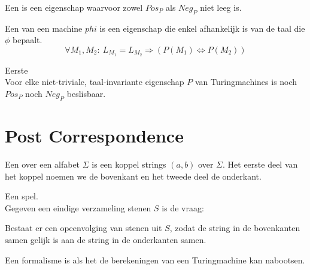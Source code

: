 \documentclass[main.tex]{subfiles}
\begin{document}
\begin{de}
  Een  is een eigenschap waarvoor zowel $Pos_{P}$ als $Neg_{P}$ niet leeg is.
\end{de}

\begin{de}
  Een  van een machine $phi$ is een eigenschap die enkel afhankelijk is van de taal die $\phi$ bepaalt.
  \[ \forall M_{1},M_{2}:\ L_{M_{1}} = L_{M_{2}} \Rightarrow (P(M_{1}) \Leftrightarrow P(M_{2})) \]
\end{de}

\begin{st}
  \label{st:eerste-stelling-van-rice}
  Eerste \\
  Voor elke niet-triviale, taal-invariante eigenschap $P$ van Turingmachines is noch $Pos_{P}$ noch $Neg_{P}$ beslisbaar.

\end{st}


\section{Post Correspondence}
\label{sec:post-correspondence}

\begin{de}
  Een  over een alfabet $\Sigma$ is een koppel strings $(a,b)$ over $\Sigma$.
  Het eerste deel van het koppel noemen we de bovenkant en het tweede deel de onderkant.
\end{de}

\begin{de}
  \label{post:correspondence}
  Een  spel.\\
  Gegeven een eindige verzameling stenen $S$ is de vraag:
  \begin{center}
    Bestaat er een opeenvolging van stenen uit $S$, zodat de string in de bovenkanten samen gelijk is aan de string in de onderkanten samen.
  \end{center}
\end{de}

\begin{de}
  \label{de:turing-compleet}
  Een formalisme is  als het de berekeningen van een Turingmachine kan nabootsen.
\end{de}
\end{document}
